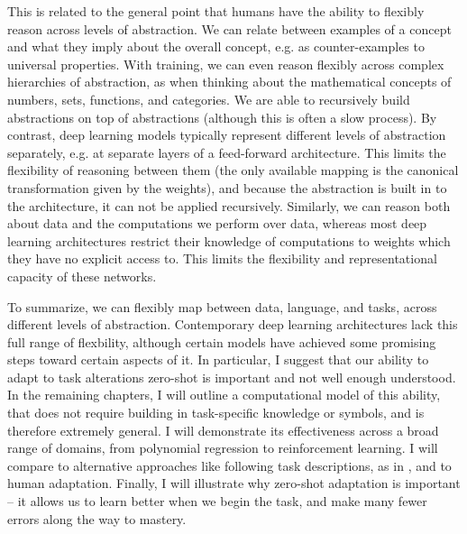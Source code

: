 This is related to the general point that humans have the ability to flexibly reason across levels of abstraction. We can relate between examples of a concept and what they imply about the overall concept, e.g. as counter-examples to universal properties. With training, we can even reason flexibly across complex hierarchies of abstraction, as when thinking about the mathematical concepts of numbers, sets, functions, and categories. We are able to recursively build abstractions on top of abstractions (although this is often a slow process). By contrast, deep learning models typically represent different levels of abstraction separately, e.g. at separate layers of a feed-forward architecture. This limits the flexibility of reasoning between them (the only available mapping is the canonical transformation given by the weights), and because the abstraction is built in to the architecture, it can not be applied recursively. Similarly, we can reason both about data and the computations we perform over data, whereas most deep learning architectures restrict their knowledge of computations to weights which they have no explicit access to. This limits the flexibility and representational capacity of these networks. \par 
To summarize, we can flexibly map between data, language, and tasks, across different levels of abstraction. Contemporary deep learning architectures lack this full range of flexbility, although certain models have achieved some promising steps toward certain aspects of it. In particular, I suggest that our ability to adapt to task alterations zero-shot is important and not well enough understood. In the remaining chapters, I will outline a computational model of this ability, that does not require building in task-specific knowledge or symbols, and is therefore extremely general. I will demonstrate its effectiveness across a broad range of domains, from polynomial regression to reinforcement learning. I will compare to alternative approaches like following task descriptions, as in \citet{Hill2019a}, and to human adaptation. Finally, I will illustrate why zero-shot adaptation is important -- it allows us to learn better when we begin the task, and make many fewer errors along the way to mastery. \par 

